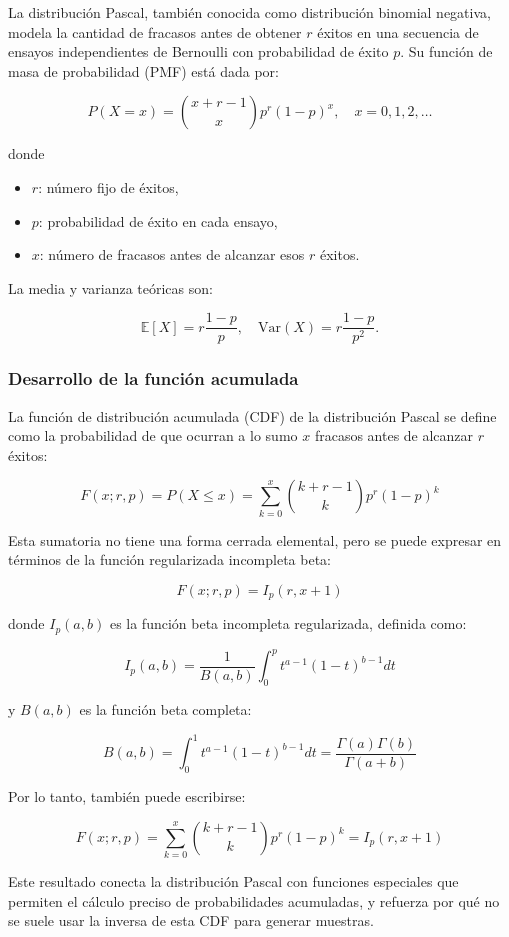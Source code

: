 \documentclass{article}
\begin{document}
La distribución Pascal, también conocida como distribución binomial negativa, modela la cantidad de fracasos antes de obtener $r$ éxitos en una secuencia de ensayos independientes de Bernoulli con probabilidad de éxito $p$. Su función de masa de probabilidad (PMF) está dada por:

\[
P(X = x) = \binom{x+r-1}{x} p^r (1-p)^x, \quad x = 0, 1, 2, \ldots
\]

donde
\begin{itemize}
    \item $r$: número fijo de éxitos,
    \item $p$: probabilidad de éxito en cada ensayo,
    \item $x$: número de fracasos antes de alcanzar esos $r$ éxitos.
\end{itemize}

La media y varianza teóricas son:

\[
\mathbb{E}[X] = r \frac{1-p}{p}, \quad \mathrm{Var}(X) = r \frac{1-p}{p^2}.
\]

\subsubsection{Desarrollo de la función acumulada}

La función de distribución acumulada (CDF) de la distribución Pascal se define como la probabilidad de que ocurran a lo sumo $x$ fracasos antes de alcanzar $r$ éxitos:

\[
F(x; r, p) = P(X \leq x) = \sum_{k=0}^{x} \binom{k + r - 1}{k} p^r (1 - p)^k
\]

Esta sumatoria no tiene una forma cerrada elemental, pero se puede expresar en términos de la función regularizada incompleta beta:

\[
F(x; r, p) = I_p(r, x + 1)
\]

donde \( I_p(a, b) \) es la función beta incompleta regularizada, definida como:

\[
I_p(a, b) = \frac{1}{B(a,b)} \int_0^p t^{a - 1} (1 - t)^{b - 1} dt
\]

y \( B(a, b) \) es la función beta completa:

\[
B(a, b) = \int_0^1 t^{a - 1} (1 - t)^{b - 1} dt = \frac{\Gamma(a)\Gamma(b)}{\Gamma(a + b)}
\]

Por lo tanto, también puede escribirse:

\[
F(x; r, p) = \sum_{k=0}^{x} \binom{k + r - 1}{k} p^r (1 - p)^k = I_p(r, x + 1)
\]

Este resultado conecta la distribución Pascal con funciones especiales que permiten el cálculo preciso de probabilidades acumuladas, y refuerza por qué no se suele usar la inversa de esta CDF para generar muestras.
\end{document}
